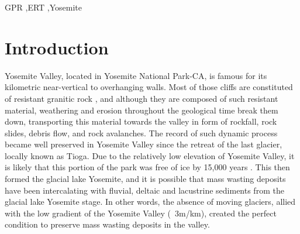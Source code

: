 \documentclass[5p]{elsarticle}
\newcommand{\alon}{\begin{color}{red}}
\newcommand{\aloff}{\end{color}}
\begin{document}
\begin{frontmatter}
\begin{abstract}
									\end{abstract}

					\begin{keyword}
GPR \sep ERT \sep Yosemite
					\end{keyword}

	\end{frontmatter}


\section{Introduction}



Yosemite Valley, located in Yosemite National Park-CA, is famous for its kilometric near-vertical to overhanging walls. Most of those cliffs are constituted of resistant granitic rock \citep{bateman1992plutonism}, and although they are composed of such resistant material, weathering and erosion throughout the geological time break them down, transporting this material towards the valley in form of rockfall, rock slides, debris flow, and rock avalanches. The record of such dynamic process became well preserved in Yosemite Valley since the retreat of the last glacier, locally known as Tioga. Due to the relatively low elevation of Yosemite Valley, it is likely that this portion of the park was free of ice by 15,000 years \citep{Wieczorek+1996}. This then formed the glacial lake Yosemite, and it is possible that mass wasting deposits have been intercalating with fluvial, deltaic and lacustrine sediments from the glacial lake Yosemite stage.   In other words, the absence of moving glaciers, allied with the low gradient of the Yosemite Valley (~3m/km), created the perfect condition to preserve mass wasting deposits in the valley. 
\end{document}
